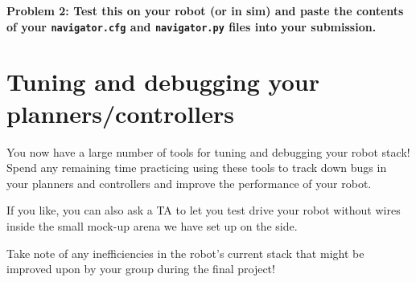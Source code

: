 \documentclass{article}
\begin{document}
{\bf Problem 2: Test this on your robot (or in sim) and paste the contents of your \texttt{navigator.cfg} and \texttt{navigator.py} files into your submission.}
\newpage

\section{Tuning and debugging your planners/controllers}
You now have a large number of tools for tuning and debugging your robot stack! Spend any remaining time practicing using these tools to track down bugs in your planners and controllers and improve the performance of your robot.

If you like, you can also ask a TA to let you test drive your robot without wires inside the small mock-up arena we have set up on the side.

Take note of any inefficiencies in the robot's current stack that might be improved upon by your group during the final project!
\end{document}
